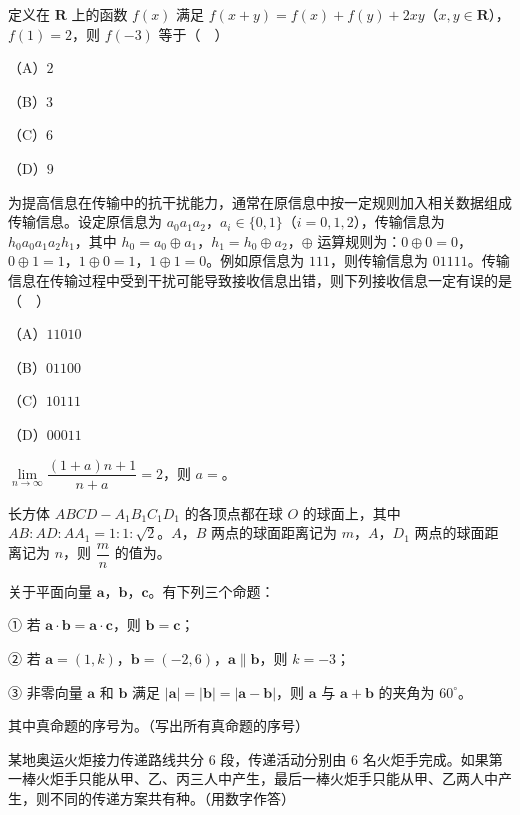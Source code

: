 \begin{question}
定义在 $\mathbf R$ 上的函数 $f(x)$ 满足 $f(x+y)=f(x)+f(y)+2xy$（$x,y\in\mathbf R$），$f(1)=2$，则 $f(-3)$ 等于（　）

（A）$2$

（B）$3$

（C）$6$

（D）$9$

\end{question}
\begin{question}
为提高信息在传输中的抗干扰能力，通常在原信息中按一定规则加入相关数据组成传输信息。设定原信息为 $a_0a_1a_2$，$a_i\in\{0,1\}$（$i=0,1,2$），传输信息为 $h_0a_0a_1a_2h_1$，其中 $h_0=a_0\oplus a_1$，$h_1=h_0\oplus a_2$，$\oplus$ 运算规则为：$0\oplus0=0$，$0\oplus1=1$，$1\oplus0=1$，$1\oplus1=0$。例如原信息为 $111$，则传输信息为 $01111$。传输信息在传输过程中受到干扰可能导致接收信息出错，则下列接收信息一定有误的是（　）

（A）$11010$

（B）$01100$

（C）$10111$

（D）$00011$

\end{question}

\begin{question}
$\lim\limits_{n\to\infty}\dfrac{(1+a)n+1}{n+a}=2$，则 $a=$\gkblank{}。

\end{question}
\begin{question}
长方体 $ABCD-A_1B_1C_1D_1$ 的各顶点都在球 $O$ 的球面上，其中 $AB:AD:AA_1=1:1:\sqrt2$。$A$，$B$ 两点的球面距离记为 $m$，$A$，$D_1$ 两点的球面距离记为 $n$，则 $\dfrac mn$ 的值为\gkblank{}。

\end{question}
\begin{question}
关于平面向量 $\boldsymbol a$，$\boldsymbol b$，$\boldsymbol c$。有下列三个命题：

① 若 $\boldsymbol a\cdot\boldsymbol b=\boldsymbol a\cdot\boldsymbol c$，则 $\boldsymbol b=\boldsymbol c$；

② 若 $\boldsymbol a=(1,k)$，$\boldsymbol b=(-2,6)$，$\boldsymbol a\parallel\boldsymbol b$，则 $k=-3$；

③ 非零向量 $\boldsymbol a$ 和 $\boldsymbol b$ 满足 $|\boldsymbol a|=|\boldsymbol b|=|\boldsymbol a-\boldsymbol b|$，则 $\boldsymbol a$ 与 $\boldsymbol a+\boldsymbol b$ 的夹角为 $60^\circ$。

其中真命题的序号为\gkblank{}。（写出所有真命题的序号）

\end{question}
\begin{question}
某地奥运火炬接力传递路线共分 $6$ 段，传递活动分别由 $6$ 名火炬手完成。如果第一棒火炬手只能从甲、乙、丙三人中产生，最后一棒火炬手只能从甲、乙两人中产生，则不同的传递方案共有\gkblank{}种。（用数字作答）

\end{question}

